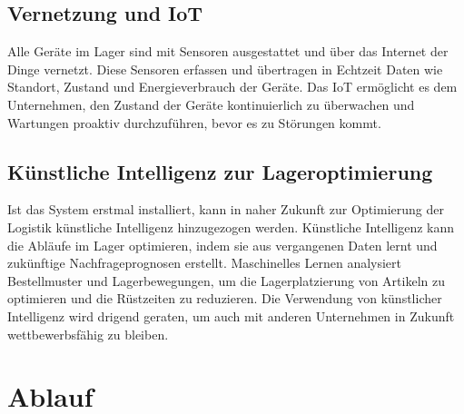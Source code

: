 \subsection{Vernetzung und IoT}
 Alle Geräte im Lager sind mit Sensoren ausgestattet und über das Internet der Dinge vernetzt. Diese Sensoren erfassen und übertragen in Echtzeit Daten wie Standort, Zustand und Energieverbrauch der Geräte. Das IoT ermöglicht es dem Unternehmen, den Zustand der Geräte kontinuierlich zu überwachen und Wartungen proaktiv durchzuführen, bevor es zu Störungen kommt.

\subsection{Künstliche Intelligenz zur Lageroptimierung}
Ist das System erstmal installiert, kann in naher Zukunft zur Optimierung der Logistik künstliche Intelligenz hinzugezogen werden. Künstliche Intelligenz kann die Abläufe im Lager optimieren, indem sie aus vergangenen Daten lernt und zukünftige Nachfrageprognosen erstellt. Maschinelles Lernen analysiert Bestellmuster und Lagerbewegungen, um die Lagerplatzierung von Artikeln zu optimieren und die Rüstzeiten zu reduzieren. Die Verwendung von künstlicher Intelligenz wird drigend geraten, um auch mit anderen Unternehmen in Zukunft wettbewerbsfähig zu bleiben.


\section{Ablauf}



